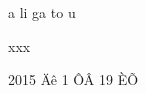 \begin{thanks}
a li ga to u


\vfill

\hfill xxx~~~~~~~~~~~~~~~~~~~

\hfill 2015 Äê 1 ÔÂ 19 ÈÕ

\end{thanks}
